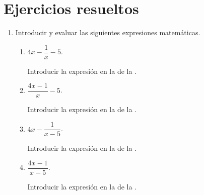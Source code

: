 \section{Ejercicios resueltos}
\begin{enumerate}
\item Introducir y evaluar las siguientes expresiones matemáticas.
      \begin{enumerate}
      \item $4x-\dfrac{1}{x}-5$.
            \begin{indication}
            Introducir la expresión  en la  de la .
            \end{indication}
      \item $\dfrac{4x-1}{x}-5$.
            \begin{indication}
            Introducir la expresión  en la  de la .
            \end{indication}
      \item $4x-\dfrac{1}{x-5}$.
            \begin{indication}
            Introducir la expresión  en la  de la .
            \end{indication}
      \item $\dfrac{4x-1}{x-5}$.
            \begin{indication}
            Introducir la expresión  en la  de la .
            \end{indication}
      \end{enumerate}


\end{enumerate}
